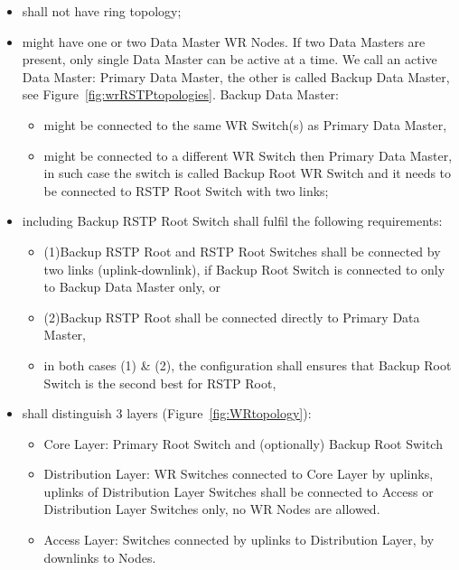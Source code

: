 \begin{itemize}
  \item shall not have ring topology; 

  \item might have one or two Data Master WR Nodes. If two Data Masters are
	present, only single Data Master can be active at a time. We call an
	active Data Master: Primary Data Master, the other is called Backup Data
	Master, see Figure~\ref{fig:wrRSTPtopologies}. Backup Data Master:
  \begin{itemize}
        \item  might be connected to the same WR Switch(s) as Primary Data
	       Master,
        \item  might be connected to a different WR Switch then Primary Data
	       Master, in such case the switch is called Backup Root WR Switch
	       and it needs to be connected to RSTP Root Switch with two
	       links;
  \end{itemize}

  \item including Backup RSTP Root Switch shall fulfil the following
	requirements:
  \begin{itemize}
        \item  (1)Backup RSTP Root and RSTP Root Switches shall be connected
	       by two links (uplink-downlink), if Backup Root Switch is
	       connected to only to Backup Data Master only, or
	\item  (2)Backup RSTP Root shall be connected directly to Primary Data
		Master,
        \item  in both cases (1) \& (2), the configuration shall ensures that
		Backup Root Switch is the second best for RSTP Root,
  \end{itemize}
	
  \item shall distinguish 3 layers (Figure~\ref{fig:WRtopology}):
  \begin{itemize}
        \item Core Layer: Primary Root Switch and (optionally) Backup Root
	      Switch
        \item Distribution Layer: WR Switches connected to Core Layer by
	      uplinks, uplinks of Distribution Layer Switches shall be
	      connected to Access or Distribution Layer Switches only, no WR
	      Nodes are allowed.
        \item Access Layer: Switches connected by uplinks to Distribution
	      Layer, by downlinks to Nodes.
  \end{itemize}


\end{itemize}
